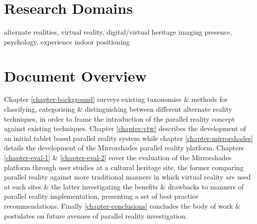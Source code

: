 
\section{Research Domains}

alternate realities, virtual reality, digital/virtual heritage
imaging
presence, psychology, experience
indoor positioning


\section{Document Overview}

Chapter \ref{chapter-background} surveys existing taxonomies \& methods for classifying, categorising \& distinguishing between different alternate reality techniques, in order to frame the introduction of the parallel reality concept against existing techniques. Chapter \ref{chapter-vtw} describes the development of an initial tablet based parallel reality system while chapter \ref{chapter-mirrorshades} details the development of the Mirrorshades parallel reality platform. Chapters \ref{chapter-eval-1} \& \ref{chapter-eval-2} cover the evaluation of the Mirrorshades platform through user studies at a cultural heritage site, the former comparing parallel reality against more traditional manners in which virtual reality are used at such sites \& the latter investigating the benefits \& drawbacks to manners of parallel reality implementation, presenting a set of best practice recommendations. Finally \ref{chapter-conclusions} concludes the body of work \& postulates on future avenues of parallel reality investigation.



















